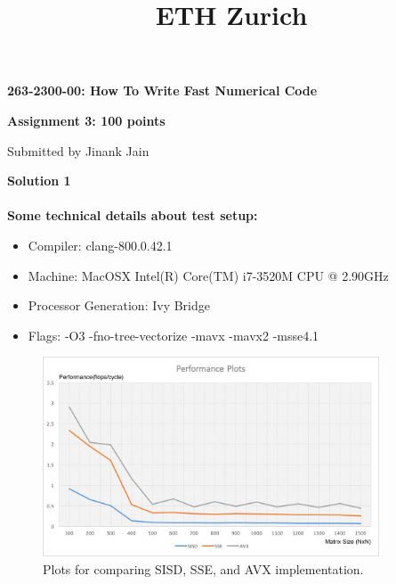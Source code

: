 \documentclass[letterpaper, 11pt]{article}
\title{ETH Zurich}
\begin{document}

\begin{center}
\Large \bf 263-2300-00: How To Write Fast Numerical Code

\Large \bf Assignment 3: 100 points

\large Submitted by Jinank Jain
\end{center}

\textbf{Solution 1}\\ \\
\textbf{Some technical details about test setup:}
\begin{itemize}
\item Compiler: clang-800.0.42.1
\item Machine: MacOSX Intel(R) Core(TM) i7-3520M CPU @ 2.90GHz
\item Processor Generation: Ivy Bridge
\item Flags: -O3 -fno-tree-vectorize -mavx -mavx2 -msse4.1
\end{itemize}
\begin{figure}[h!]
    \centering
    \includegraphics[width=100mm]{ques1}
    \caption{Plots for comparing SISD, SSE, and AVX implementation.}
    \label{fig:runtime}
\end{figure}
\end{document}
